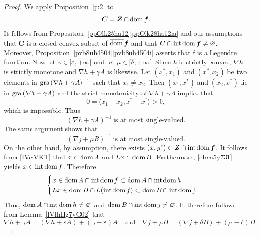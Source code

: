 \documentclass[a4paper,11pt,fleqn]{article}
\newcommand{\pair}[2]{\langle{{#1},{#2}}\rangle}
\newcommand{\emp}{\ensuremath{{\varnothing}}}
\newcommand{\pinf}{\ensuremath{{+\infty}}}
\newcommand{\dom}{\ensuremath{\text{\rm dom}\,}}
\newcommand{\intdom}{\ensuremath{\text{\rm int\,dom}\,}}
\newcommand{\gra}{\ensuremath{\text{\rm gra}\,}}
\theoremstyle{plain}{\theorembodyfont{\rmfamily}%
\newtheorem{conjecture}[theorem]{Conjecture}}
\theoremstyle{plain}{\theorembodyfont{\rmfamily}%
\newtheorem{example}[theorem]{Example}}
\theoremstyle{plain}{\theorembodyfont{\rmfamily}%
\newtheorem{remark}[theorem]{Remark}}
\theoremstyle{plain}{\theorembodyfont{\rmfamily}%
\newtheorem{algorithm}[theorem]{Algorithm}}
\theoremstyle{plain}{\theorembodyfont{\rmfamily}%
\newtheorem{condition}[theorem]{Condition}}
\theoremstyle{plain}{\theorembodyfont{\rmfamily}%
\newtheorem{definition}[theorem]{Definition}}
\theoremstyle{plain}{\theorembodyfont{\rmfamily}
\newtheorem{problem}[theorem]{Problem}}
\theoremstyle{plain}{\theorembodyfont{\rmfamily}
\newtheorem{notation}[theorem]{Notation}}
\numberwithin{equation}{section}
\begin{document}
\begin{proof}
We apply Proposition~\ref{p:2} to 
\begin{equation}
\label{4e:C}
\boldsymbol{C}=\boldsymbol{Z}\cap\overline{\dom}\boldsymbol{f}.
\end{equation}
It follows from Proposition~\ref{ppOlk28ha12}\ref{ppOlk28ha12ia}
and our assumptions that $\boldsymbol{C}$ is a closed convex 
subset of $\overline{\dom}\boldsymbol{f}$ and that
$\boldsymbol{C}\cap\intdom\boldsymbol{f}\neq\emp$. 
Moreover, Proposition~\ref{pvb8uh4504}\ref{pvb8uh4504i}
asserts that $\boldsymbol{f}$ is a Legendre function.
Now let $\gamma\in[\varepsilon,\pinf[$ and let 
$\mu\in[\delta,\pinf[$.
Since $h$ is strictly convex, $\nabla h$ is 
strictly monotone \cite[Theorem~2.4.4(ii)]{IVZali02} and 
$\nabla h+\gamma A$ is likewise. Let $(x^*,x_1)$ and 
$(x^*,x_2)$ be two elements in $\gra(\nabla h+\gamma A)^{-1}$ 
such that $x_1\not=x_2$. Then $(x_1,x^*)$ and $(x_2,x^*)$ lie in 
$\gra(\nabla h+\gamma A)$ and the strict monotonicity of 
$\nabla h+\gamma A$ implies that 
\begin{equation}
0=\pair{x_1-x_2}{x^*-x^*}>0,
\end{equation}
which is impossible. Thus,
\begin{equation}
\label{4e:single1}
(\nabla h+\gamma A)^{-1}\;\text{is at most single-valued}.
\end{equation} 
The same argument shows that
\begin{equation}
\label{4e:single2}
(\nabla j+\mu B)^{-1}\;\text{is at most single-valued}.
\end{equation} 
On the other hand, by assumption, there exists
$(x,y^*)\in\boldsymbol{Z}\cap\intdom\boldsymbol{f}$.
It follows from \eqref{IVe:VKT} that $x\in\dom A$ and 
$Lx\in\dom B$. Furthermore, \eqref{ebcn5y731} yields 
$x\in\intdom f$. Therefore
\begin{equation}
\label{ehHg7yG10a}
\begin{cases}
x\in\dom A\cap\intdom f\subset\dom A\cap\intdom h\\
Lx\in\dom B\cap L(\intdom f)\subset\dom B\cap\intdom j.
\end{cases}
\end{equation}
Thus, $\dom A\cap\intdom h\neq\emp$ and
$\dom B\cap\intdom j\neq\emp$. It therefore follows from
Lemma~\ref{IVlhHg7yG02} that
\begin{equation}
\label{4e:single3}
\nabla h+\gamma A=(\nabla h+\varepsilon A)+(\gamma-\varepsilon)A 
\quad\text{and}\quad
\nabla j+\mu B=(\nabla j+\delta B)+(\mu-\delta)B

\end{equation}
\end{proof}
\end{document}
